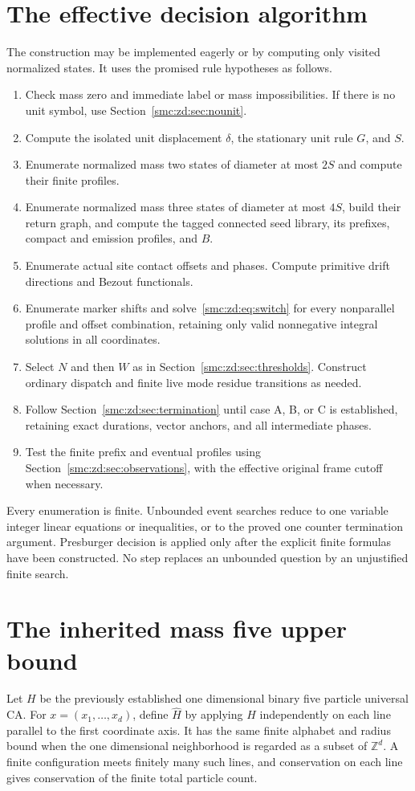 \documentclass[11pt,letterpaper]{article}
\numberwithin{equation}{section}
\theoremstyle{definition}
\theoremstyle{remark}
\newcommand{\Z}{\mathbb Z}
\begin{document}
\section{The effective decision algorithm}\label{smc:zd:sec:algorithm}
The construction may be implemented eagerly or by computing only visited normalized states. It uses the promised rule hypotheses as follows.
\begin{enumerate}
\item Check mass zero and immediate label or mass impossibilities. If there is no unit symbol, use Section~\ref{smc:zd:sec:nounit}.
\item Compute the isolated unit displacement $\delta$, the stationary unit rule $G$, and $S$.
\item Enumerate normalized mass two states of diameter at most $2S$ and compute their finite profiles.
\item Enumerate normalized mass three states of diameter at most $4S$, build their return graph, and compute the tagged connected seed library, its prefixes, compact and emission profiles, and $B$.
\item Enumerate actual site contact offsets and phases. Compute primitive drift directions and Bezout functionals.
\item Enumerate marker shifts and solve~\eqref{smc:zd:eq:switch} for every nonparallel profile and offset combination, retaining only valid nonnegative integral solutions in all coordinates.
\item Select $N$ and then $W$ as in Section~\ref{smc:zd:sec:thresholds}. Construct ordinary dispatch and finite live mode residue transitions as needed.
\item Follow Section~\ref{smc:zd:sec:termination} until case A, B, or C is established, retaining exact durations, vector anchors, and all intermediate phases.
\item Test the finite prefix and eventual profiles using Section~\ref{smc:zd:sec:observations}, with the effective original frame cutoff when necessary.
\end{enumerate}
Every enumeration is finite. Unbounded event searches reduce to one variable integer linear equations or inequalities, or to the proved one counter termination argument. Presburger decision is applied only after the explicit finite formulas have been constructed. No step replaces an unbounded question by an unjustified finite search.

\section{The inherited mass five upper bound}\label{smc:zd:sec:boundary}
Let $H$ be the previously established one dimensional binary five particle universal CA. For $x=(x_1,\ldots,x_d)$, define $\widehat H$ by applying $H$ independently on each line parallel to the first coordinate axis. It has the same finite alphabet and radius bound when the one dimensional neighborhood is regarded as a subset of $\Z^d$. A finite configuration meets finitely many such lines, and conservation on each line gives conservation of the finite total particle count.
\end{document}
